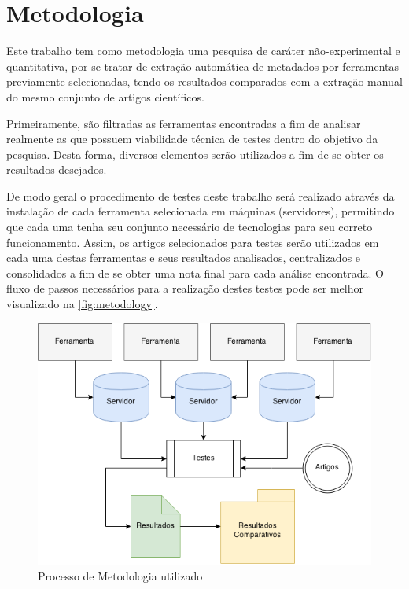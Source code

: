 
\chapter{Metodologia}
\label{cha:metodology}

Este trabalho tem como metodologia uma pesquisa de caráter não-experimental e quantitativa, por se tratar de extração automática de metadados por ferramentas previamente selecionadas, tendo os resultados comparados com a extração manual do mesmo conjunto de artigos científicos.


Primeiramente, são filtradas as ferramentas encontradas a fim de analisar realmente as que possuem viabilidade técnica de testes dentro do objetivo da pesquisa. Desta forma, diversos elementos serão utilizados a fim de se obter os resultados desejados.


De modo geral o procedimento de testes deste trabalho será realizado através da instalação de cada ferramenta selecionada em máquinas (servidores), permitindo que cada uma tenha seu conjunto necessário de tecnologias para seu correto funcionamento. Assim, os artigos selecionados para testes serão utilizados em cada uma destas ferramentas e seus resultados analisados, centralizados e consolidados a fim de se obter uma nota final para cada análise encontrada. O fluxo de passos necessários para a realização destes testes pode ser melhor visualizado na \autoref{fig:metodology}.

\begin{figure}
    \centering
    \caption{Processo de Metodologia utilizado}
    \label{fig:metodology}
    \includegraphics[width=0.8\linewidth]{./assets/images/metodology}
\end{figure}


